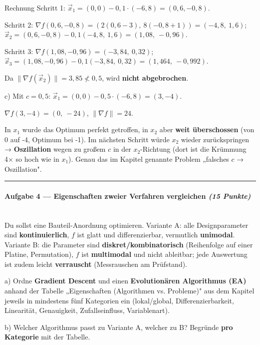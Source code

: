 \documentclass[11pt, a4paper]{article}
\begin{document}
Rechnung Schritt 1: $\vec x_1 = (0,0) - 0{,}1 \cdot (-6, 8) = (0{,}6, -0{,}8)$.

Schritt 2: $\nabla f(0{,}6,-0{,}8) = (2(0{,}6-3),\ 8(-0{,}8+1)) = (-4{,}8,\ 1{,}6)$; $\vec x_2 = (0{,}6,-0{,}8) - 0{,}1(-4{,}8,\ 1{,}6) = (1{,}08,\ -0{,}96)$.

Schritt 3: $\nabla f(1{,}08,-0{,}96) = (-3{,}84,\ 0{,}32)$; $\vec x_3 = (1{,}08,-0{,}96) - 0{,}1(-3{,}84,\ 0{,}32) = (1{,}464,\ -0{,}992)$.


Da $\|\nabla f(\vec x_2)\| = 3{,}85 \not< 0{,}5$, wird \textbf{nicht abgebrochen}.


c) Mit $c = 0{,}5$: $\vec x_1 = (0,0) - 0{,}5\cdot(-6,8) = (3, -4)$.

$\nabla f(3,-4) = (0,\ -24)$, $\|\nabla f\| = 24$.

In $x_1$ wurde das Optimum perfekt getroffen, in $x_2$ aber \textbf{weit überschossen} (von 0 auf -4, Optimum bei -1). Im nächsten Schritt würde $x_2$ wieder zurückspringen → \textbf{Oszillation} wegen zu großem $c$ in der $x_2$-Richtung (dort ist die Krümmung 4× so hoch wie in $x_1$). Genau das im Kapitel genannte Problem „falsches $c$ → Oszillation".



\noindent\textcolor{rulegray}{\rule{\linewidth}{0.4pt}}


\paragraph{Aufgabe 4 — Eigenschaften zweier Verfahren vergleichen \textit{(15 Punkte)}}\mbox{}\\[2pt]

Du sollst eine Bauteil-Anordnung optimieren. Variante A: alle Designparameter sind \textbf{kontinuierlich}, $f$ ist glatt und differenzierbar, vermutlich \textbf{unimodal}. Variante B: die Parameter sind \textbf{diskret/kombinatorisch} (Reihenfolge auf einer Platine, Permutation), $f$ ist \textbf{multimodal} und nicht ableitbar; jede Auswertung ist zudem leicht \textbf{verrauscht} (Messrauschen am Prüfstand).


a) Ordne \textbf{Gradient Descent} und einen \textbf{Evolutionären Algorithmus (EA)} anhand der Tabelle „Eigenschaften (Algorithmen vs. Probleme)" aus dem Kapitel jeweils in mindestens fünf Kategorien ein (lokal/global, Differenzierbarkeit, Linearität, Genauigkeit, Zufallseinfluss, Variablenart).


b) Welcher Algorithmus passt zu Variante A, welcher zu B? Begründe \textbf{pro Kategorie} mit der Tabelle.
\end{document}
